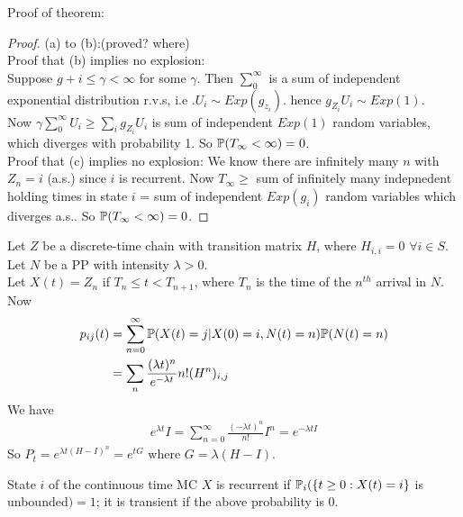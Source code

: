\documentclass[a4paper]{article}
\begin{document}
Proof of theorem:
\begin{proof}
(a) to (b):(proved? where) \\
Proof that (b) implies no explosion:\\
Suppose $g+i \leq \gamma < \infty$ for some $\gamma$. Then $\sum_0^\infty$ is a sum of independent exponential distribution r.v.s, i.e .$U_i \sim Exp(g_{z_i})$. hence $g_{Z_i} U_i \sim Exp(1)$.\\
Now $\gamma \sum_0^\infty U_i \geq \sum_i g_{Z_i} U_i$ is sum of independent $Exp(1)$ random variables, which diverges with probability 1. So $\P(T_\infty < \infty) = 0$.\\
Proof that (c) implies no explosion: We know there are infinitely many $n$ with $Z_n = i$ (a.s.) since $i$ is recurrent. Now $T_\infty \geq$ sum of infinitely many indepnedent holding times in state $i$ = sum of independent $Exp(g_i)$ random variables which diverges a.s.. So $\P(T_\infty < \infty) = 0$.
\end{proof}

\begin{eg}
Let $Z$ be a discrete-time chain with transition matrix $H$, where $H_{i,i} = 0$ $\forall i \in S$. Let $N$ be a PP with intensity $\lambda>0$.\\
Let $X(t) = Z_n$ if $T_n \leq t < T_{n+1}$, where $T_n$ is the time of the $n^{th}$ arrival in $N$. Now
\begin{equation*}
\begin{aligned}
p_{ij}(t) &= \sum_{n=0}^\infty \P(X(t) = j | X(0)=i,N(t) = n) \P(N(t) = n)\\
&= \sum_n \frac{(\lambda t)^n}{e^{-\lambda t}}{n!} (H^n)_{i,j}
\end{aligned}
\end{equation*}
We have
\begin{equation*}
\begin{aligned}
e^{\lambda t} I = \sum_{n=0}^\infty \frac{(-\lambda t)^n}{n!} I^n = e^{-\lambda t I}
\end{aligned}
\end{equation*}
So $P_t = e^{\lambda t(H-I)^n} = e^{tG}$ where $G=\lambda(H-I)$.
\end{eg}

\begin{defi}
State $i$ of the continuous time MC $X$ is recurrent if $\P_i(\{t \geq 0: X(t) = i\}$ is unbounded$)=1$; it is transient if the above probability is 0.
\end{defi}
\end{document}
